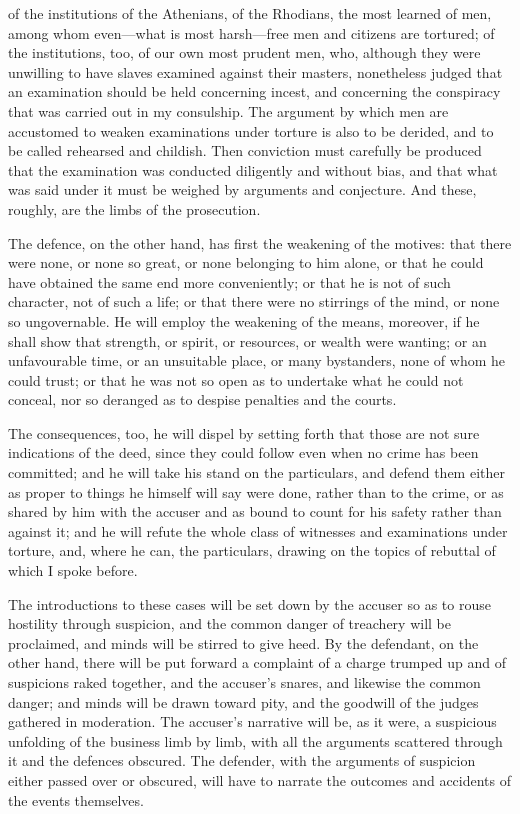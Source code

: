  of the institutions of the Athenians, of the Rhodians, the most learned of men, among whom even—what is most harsh—free men and citizens are tortured; of the institutions, too, of our own most prudent men, who, although they were unwilling to have slaves examined against their masters, nonetheless judged that an examination should be held concerning incest, and concerning the conspiracy that was carried out in my consulship. The argument by which men are accustomed to weaken examinations under torture is also to be derided, and to be called rehearsed and childish. Then conviction must carefully be produced that the examination was conducted diligently and without bias, and that what was said under it must be weighed by arguments and conjecture. And these, roughly, are the limbs of the prosecution.

 The defence, on the other hand, has first the weakening of the motives: that there were none, or none so great, or none belonging to him alone, or that he could have obtained the same end more conveniently; or that he is not of such character, not of such a life; or that there were no stirrings of the mind, or none so ungovernable. He will employ the weakening of the means, moreover, if he shall show that strength, or spirit, or resources, or wealth were wanting; or an unfavourable time, or an unsuitable place, or many bystanders, none of whom he could trust; or that he was not so open as to undertake what he could not conceal, nor so deranged as to despise penalties and the courts.

 The consequences, too, he will dispel by setting forth that those are not sure indications of the deed, since they could follow even when no crime has been committed; and he will take his stand on the particulars, and defend them either as proper to things he himself will say were done, rather than to the crime, or as shared by him with the accuser and as bound to count for his safety rather than against it; and he will refute the whole class of witnesses and examinations under torture, and, where he can, the particulars, drawing on the topics of rebuttal of which I spoke before.

 The introductions to these cases will be set down by the accuser so as to rouse hostility through suspicion, and the common danger of treachery will be proclaimed, and minds will be stirred to give heed. By the defendant, on the other hand, there will be put forward a complaint of a charge trumped up and of suspicions raked together, and the accuser's snares, and likewise the common danger; and minds will be drawn toward pity, and the goodwill of the judges gathered in moderation. The accuser's narrative will be, as it were, a suspicious unfolding of the business limb by limb, with all the arguments scattered through it and the defences obscured. The defender, with the arguments of suspicion either passed over or obscured, will have to narrate the outcomes and accidents of the events themselves.

